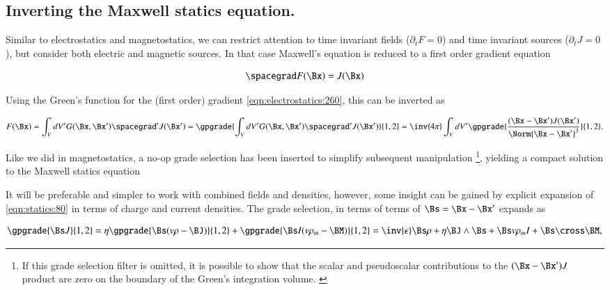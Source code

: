 %
%
\subsection{Inverting the Maxwell statics equation.}

Similar to electrostatics and magnetostatics, we can restrict attention to time invariant fields (\( \partial_t F = 0\)) and time invariant sources (\(\partial_t J = 0\)), but consider both electric and magnetic sources.  In that case Maxwell's equation is reduced to a first order gradient equation

\begin{dmath}\label{eqn:statics:20}
\spacegrad F(\Bx) = J(\Bx)
\end{dmath}

Using the Green's function for the (first order) gradient \cref{eqn:electrostatics:260}, this can be inverted as

\begin{dmath}\label{eqn:statics:40}
F(\Bx)
= \int_V dV' G(\Bx, \Bx') \spacegrad' J(\Bx')
= \gpgrade{\int_V dV' G(\Bx, \Bx') \spacegrad' J(\Bx')}{1,2}
= \inv{4\pi} \int_V dV' \gpgrade{\frac{(\Bx - \Bx') J(\Bx')}{\Norm{\Bx - \Bx'}^3} }{1,2}.
\end{dmath}

Like we did in magnetostatics, a no-op grade selection has been inserted to simplify subsequent manipulation
\footnote{If this grade selection filter is omitted, it is possible to show that the scalar and pseudoscalar contributions to the \( (\Bx -\Bx') J \) product are zero on the boundary of the Green's integration volume. \citep{jancewicz1988multivectors:appendixI}},
yielding a compact solution to the
Maxwell statics equation


It will be preferable and simpler to work with combined fields and densities, however, some insight can be gained by
explicit expansion of \cref{eqn:statics:80} in terms of charge and current densities.
The grade selection, in terms of terms of \( \Bs = \Bx -\Bx' \) expands as

\begin{dmath}\label{eqn:statics:60}
\gpgrade{\Bs J}{1,2}
=
\eta \gpgrade{\Bs (v \rho - \BJ)}{1,2}
+
\gpgrade{\Bs I(v \rho_m - \BM)}{1,2}
=
\inv{\epsilon} \Bs \rho + \eta \BJ \wedge \Bs + \Bs v \rho_m I + \Bs \cross \BM,
\end{dmath}

